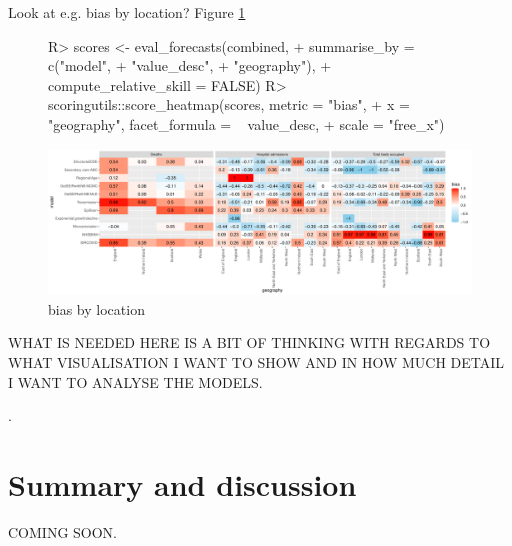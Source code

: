 \documentclass[article,shortnames]{jss}
\begin{document}
Look at e.g. bias by location? Figure \ref{fig:bias-heatmap}

\begin{figure}[h]
\centering
\begin{Schunk}
\begin{Sinput}
R> scores <- eval_forecasts(combined, 
+                           summarise_by = c("model",
+                                            "value_desc", 
+                                            "geography"), 
+                           compute_relative_skill = FALSE)
R> scoringutils::score_heatmap(scores, metric = "bias", 
+                              x = "geography", facet_formula = ~ value_desc, 
+                              scale = "free_x")
\end{Sinput}
\end{Schunk}
\includegraphics{plots/plot-calibration}
\caption{\label{fig:bias-heatmap} bias by location}
\end{figure}

WHAT IS NEEDED HERE IS A BIT OF THINKING WITH REGARDS TO WHAT VISUALISATION I WANT TO SHOW AND IN HOW MUCH DETAIL I WANT TO ANALYSE THE MODELS. 


\begin{CodeInput}
.
\end{CodeInput}







\section{Summary and discussion} \label{sec:summary}

COMING SOON. 


\end{document}
